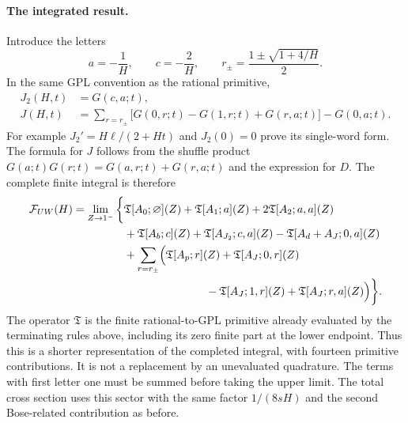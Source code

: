 \paragraph{The integrated result.} Introduce the letters
\begin{equation}
 a=-\frac1H,\qquad c=-\frac2H,\qquad
 r_\pm=\frac{1\pm\sqrt{1+4/H}}2.
\end{equation}
In the same GPL convention as the rational primitive,
\begin{align}
 J_2(H,t)&=G(c,a;t),\\
 J(H,t)&=\sum_{r=r_\pm}
       \bigl[G(0,r;t)-G(1,r;t)+G(r,a;t)\bigr]-G(0,a;t).
\end{align}
For example $J_2'=H\ell/(2+Ht)$ and $J_2(0)=0$ prove its single-word
form. The formula for $J$ follows from the shuffle product
$G(a;t)G(r;t)=G(a,r;t)+G(r,a;t)$ and the expression for $D$.
The complete finite integral is therefore
\begin{equation}
\begin{aligned}
 \mathcal F_{UW}(H)=\lim_{Z\to1^-}\bigg\{&
 \mathfrak T[A_0;\varnothing](Z)+\mathfrak T[A_1;a](Z)
 +2\mathfrak T[A_2;a,a](Z)\\
 &+\mathfrak T[A_b;c](Z)+\mathfrak T[A_{J_2};c,a](Z)
 -\mathfrak T[A_d+A_J;0,a](Z)\\
 &+\sum_{r=r_\pm}\Bigl(
 \mathfrak T[A_p;r](Z)+\mathfrak T[A_J;0,r](Z)\\
 &\hspace{26mm}-\mathfrak T[A_J;1,r](Z)
 +\mathfrak T[A_J;r,a](Z)\Bigr)\bigg\}.
\end{aligned}
\label{eq:comp-UW-short-primitive}
\end{equation}
The operator $\mathfrak T$ is the finite rational-to-GPL primitive
already evaluated by the terminating rules above, including its
zero finite part at the lower endpoint. Thus this is a shorter
representation of the completed integral, with fourteen primitive
contributions. It is not a replacement by an unevaluated quadrature.
The terms with first letter one must be summed before taking the
upper limit. The total cross section uses this sector with the same
factor $1/(8sH)$ and the second Bose-related contribution as before.

